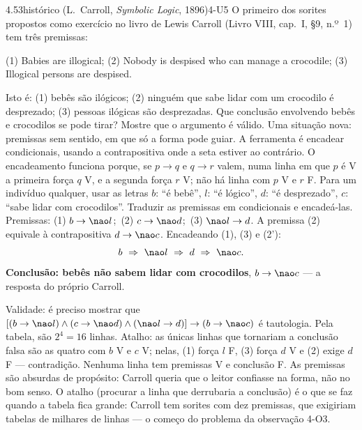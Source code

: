 \begin{exemplo}{4.5}{3}{histórico (L.~Carroll, \emph{Symbolic Logic}, 1896)}{4-U5}\label{ex:4.5}
O primeiro dos sorites propostos como exercício no livro de Lewis Carroll (Livro VIII, cap.~I, §9, n.º~1) tem três premissas:
\begin{citacao}
(1) Babies are illogical; (2) Nobody is despised who can manage a crocodile; (3) Illogical persons are despised.
\end{citacao}
Isto é: (1) bebês são ilógicos; (2) ninguém que sabe lidar com um crocodilo é desprezado; (3) pessoas ilógicas são desprezadas. Que conclusão envolvendo bebês e crocodilos se pode tirar? Mostre que o argumento é válido.
\plano Uma situação nova: premissas sem sentido, em que só a forma pode guiar. A ferramenta é encadear condicionais, usando a contrapositiva onde a seta estiver ao contrário. O encadeamento funciona porque, se $p\rightarrow q$ e $q\rightarrow r$ valem, numa linha em que $p$ é V a primeira força $q$ V, e a segunda força $r$ V; não há linha com $p$ V e $r$ F. Para um indivíduo qualquer, usar as letras $b$: \enquote{é bebê}, $l$: \enquote{é lógico}, $d$: \enquote{é desprezado}, $c$: \enquote{sabe lidar com crocodilos}. Traduzir as premissas em condicionais e encadeá-las.
\resolucao
Premissas: (1) $b\rightarrow{\nao}l$;\ (2) $c\rightarrow{\nao}d$;\ (3) ${\nao}l\rightarrow d$.
A premissa (2) equivale à contrapositiva $d\rightarrow{\nao}c$. Encadeando (1), (3) e (2'):
\[b\ \Rightarrow\ {\nao}l\ \Rightarrow\ d\ \Rightarrow\ {\nao}c.\]
\textbf{Conclusão: bebês não sabem lidar com crocodilos}, $b\rightarrow{\nao}c$ — a resposta do próprio Carroll.
\par Validade: é preciso mostrar que $[(b\rightarrow{\nao}l)\wedge(c\rightarrow{\nao}d)\wedge({\nao}l\rightarrow d)]\rightarrow(b\rightarrow{\nao}c)$ é tautologia. Pela tabela, são $2^4=16$ linhas. Atalho: as únicas linhas que tornariam a conclusão falsa são as quatro com $b$ V e $c$ V; nelas, (1) força $l$ F, (3) força $d$ V e (2) exige $d$ F — contradição. Nenhuma linha tem premissas V e conclusão F.
\comentario As premissas são absurdas de propósito: Carroll queria que o leitor confiasse na forma, não no bom senso. O atalho (procurar a linha que derrubaria a conclusão) é o que se faz quando a tabela fica grande: Carroll tem sorites com dez premissas, que exigiriam tabelas de milhares de linhas — o começo do problema da observação 4-O3.
\end{exemplo}

\Questoes

